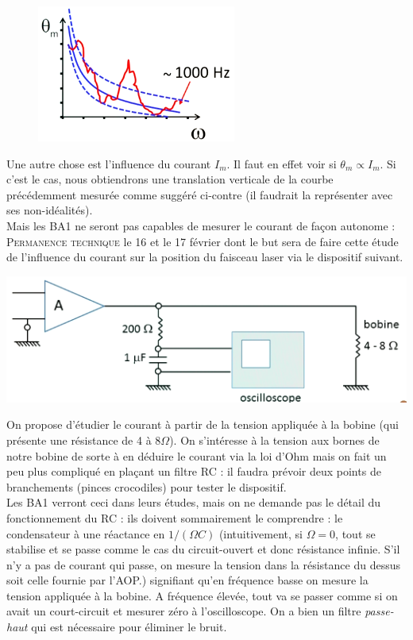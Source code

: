 \begin{figure}
\vspace{-15mm}
\includegraphics[scale=0.45]{ch1/image4.png}
\end{figure}
Une autre chose est l’influence du courant $I_m$. Il faut en effet voir si $\theta_m \propto I_m$. Si c'est le
cas, nous obtiendrons une translation verticale de la courbe précédemment mesurée comme suggéré ci-contre 
(il faudrait la représenter avec ses non-idéalités).\\

 Mais les BA1 ne seront pas capables de mesurer le 
courant de façon autonome : \textsc{Permanence technique} le 16 et le 17 février dont le but sera de faire cette
étude de l’influence du courant sur la position du faisceau laser via le dispositif suivant.


\begin{center}
\includegraphics[scale=0.65]{ch1/image5.png}
\end{center}

On propose d'étudier le courant à partir de la tension appliquée à la bobine (qui présente une résistance de 
4 à 8$\Omega$). On s'intéresse à la tension aux bornes de notre bobine de sorte à en déduire le courant via
la loi d'Ohm mais on fait un peu plus compliqué en plaçant un filtre RC : il faudra prévoir deux points de
branchements (pinces crocodiles) pour tester le dispositif.\\

Les BA1 verront ceci dans leurs études, mais on ne demande pas le détail du fonctionnement du RC : ils doivent
sommairement le comprendre : le condensateur à une réactance en $1/(\Omega C)$ (intuitivement, si $\Omega=0$, 
tout se stabilise et se passe comme le cas du circuit-ouvert et donc résistance infinie. S'il n'y a pas de 
courant qui passe, on mesure la tension dans la résistance du dessus soit celle fournie par l'AOP.) signifiant
qu'en fréquence basse on mesure la tension appliquée à la bobine. A fréquence élevée, tout va se passer comme
si on avait un court-circuit et mesurer zéro à l'oscilloscope. On a bien un filtre \textit{passe-haut} qui est
nécessaire pour éliminer le bruit.\\

